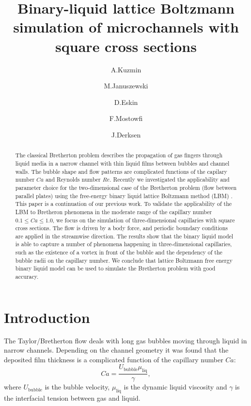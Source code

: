 \documentclass{article}
\title{Binary-liquid lattice Boltzmann simulation of microchannels with square cross sections}
\author{A.Kuzmin \and M.Januszewski \and D.Eskin \and F.Mostowfi \and J.Derksen}
\begin{document}
\maketitle
\begin{abstract}
The classical Bretherton problem describes the propagation of gas fingers through liquid media in a
narrow channel with
thin liquid films between bubbles and channel walls. The bubble shape and flow patterns are
complicated functions of the capilary number $Ca$ and Reynolds number $Re$. Recently we investigated
the applicability and parameter choice for the two-dimensional case of the Bretherton problem (flow
between parallel plates) using the free-energy binary liquid lattice Boltzmann method (LBM)
\cite{kuzmin-binary2d}. This paper is a continuation of our previous work.  To validate the applicability
of the LBM to Bretheron phenomena in the moderate range of the capillary number $0.1\leq Ca \leq 1.0$,
we focus on the simulation of three-dimensional capillaries with square cross sections.
The flow is driven by a body force, and
periodic boundary conditions are applied in the streamwise direction. The results show that the
binary liquid model is able to capture a number of phenomena happening in three-dimensional
capillaries, such as the existence of a vortex in front of the bubble and the dependency
of the bubble radii on the capillary number.  We conclude that lattice Boltzmann free energy binary
liquid model can be used to simulate the Bretherton problem with good accuracy. 
\end{abstract}

\section{Introduction}
The Taylor/Bretherton \cite{bretherton} flow deals with long gas bubbles moving through liquid in
narrow channels. Depending on the channel geometry it was found that the deposited film thickness
is a complicated function of the capillary number $Ca$:
\begin{equation}
\label{capillary:number:definition}
Ca=\frac{U_{\mathrm{bubble}} \mu_{\mathrm{liq}}}{\gamma},
\end{equation}
where $U_{\mathrm{bubble}}$ is the bubble velocity, $\mu_{\mathrm{liq}}$ is the
dynamic liquid viscosity and $\gamma$ is the interfacial tension between gas and liquid. 
\end{document}
